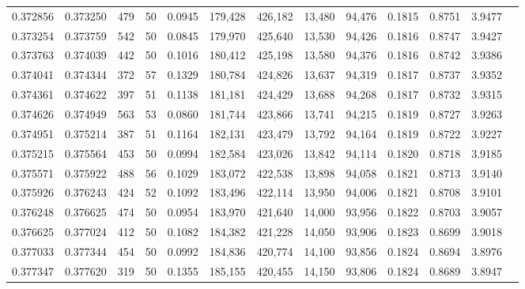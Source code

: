\begin{tabular}{rrrrrrrrrrrrr}
0.372856 & 0.373250 &   479 &  50 &                                     0.0945 & 179,428 & 426,182 &  13,480 &  94,476 & 0.1815 & 0.8751 & 3.9477 \\
0.373254 & 0.373759 &   542 &  50 &                                     0.0845 & 179,970 & 425,640 &  13,530 &  94,426 & 0.1816 & 0.8747 & 3.9427 \\
0.373763 & 0.374039 &   442 &  50 &                                     0.1016 & 180,412 & 425,198 &  13,580 &  94,376 & 0.1816 & 0.8742 & 3.9386 \\
0.374041 & 0.374344 &   372 &  57 &                                     0.1329 & 180,784 & 424,826 &  13,637 &  94,319 & 0.1817 & 0.8737 & 3.9352 \\
0.374361 & 0.374622 &   397 &  51 &                                     0.1138 & 181,181 & 424,429 &  13,688 &  94,268 & 0.1817 & 0.8732 & 3.9315 \\
0.374626 & 0.374949 &   563 &  53 &                                     0.0860 & 181,744 & 423,866 &  13,741 &  94,215 & 0.1819 & 0.8727 & 3.9263 \\
0.374951 & 0.375214 &   387 &  51 &                                     0.1164 & 182,131 & 423,479 &  13,792 &  94,164 & 0.1819 & 0.8722 & 3.9227 \\
0.375215 & 0.375564 &   453 &  50 &                                     0.0994 & 182,584 & 423,026 &  13,842 &  94,114 & 0.1820 & 0.8718 & 3.9185 \\
0.375571 & 0.375922 &   488 &  56 &                                     0.1029 & 183,072 & 422,538 &  13,898 &  94,058 & 0.1821 & 0.8713 & 3.9140 \\
0.375926 & 0.376243 &   424 &  52 &                                     0.1092 & 183,496 & 422,114 &  13,950 &  94,006 & 0.1821 & 0.8708 & 3.9101 \\
0.376248 & 0.376625 &   474 &  50 &                                     0.0954 & 183,970 & 421,640 &  14,000 &  93,956 & 0.1822 & 0.8703 & 3.9057 \\
0.376625 & 0.377024 &   412 &  50 &                                     0.1082 & 184,382 & 421,228 &  14,050 &  93,906 & 0.1823 & 0.8699 & 3.9018 \\
0.377033 & 0.377344 &   454 &  50 &                                     0.0992 & 184,836 & 420,774 &  14,100 &  93,856 & 0.1824 & 0.8694 & 3.8976 \\
0.377347 & 0.377620 &   319 &  50 &                                     0.1355 & 185,155 & 420,455 &  14,150 &  93,806 & 0.1824 & 0.8689 & 3.8947 \\

\end{tabular}
